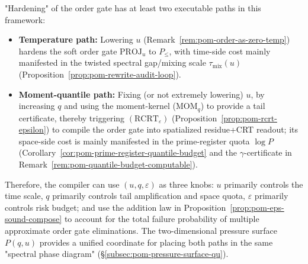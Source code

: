 \begin{remark}\label{rem:pom-hardening-u-vs-q}
"Hardening" of the order gate has at least two executable paths in this framework:
\begin{itemize}
  \item \textbf{Temperature path:} Lowering $u$ (Remark~\ref{rem:pom-order-as-zero-temp}) hardens the soft order gate $\mathrm{PROJ}_u$ to $P_{\le}$, with time-side cost mainly manifested in the twisted spectral gap/mixing scale $\tau_{\mathrm{mix}}(u)$ (Proposition~\ref{prop:pom-rewrite-audit-loop}).
  \item \textbf{Moment-quantile path:} Fixing (or not extremely lowering) $u$, by increasing $q$ and using the moment-kernel ($\mathrm{MOM}_q$) to provide a tail certificate, thereby triggering $(\mathrm{RCRT}_\varepsilon)$ (Proposition~\ref{prop:pom-rcrt-epsilon}) to compile the order gate into spatialized residue+CRT readout; its space-side cost is mainly manifested in the prime-register quota $\log P$ (Corollary~\ref{cor:pom-prime-register-quantile-budget} and the $\gamma$-certificate in Remark~\ref{rem:pom-quantile-budget-computable}).
\end{itemize}
Therefore, the compiler can use $(u,q,\varepsilon)$ as three knobs: $u$ primarily controls the time scale, $q$ primarily controls tail amplification and space quota, $\varepsilon$ primarily controls risk budget; and use the addition law in Proposition~\ref{prop:pom-eps-sound-compose} to account for the total failure probability of multiple approximate order gate eliminations.
The two-dimensional pressure surface $P(q,u)$ provides a unified coordinate for placing both paths in the same "spectral phase diagram" (\S\ref{subsec:pom-pressure-surface-qu}).
\end{remark}

